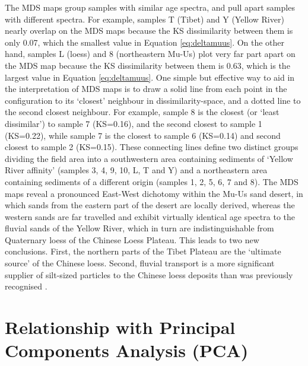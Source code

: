 \documentclass[authoryear,preprint,review,12pt]{elsarticle}
\begin{document}
The MDS maps group samples with similar age spectra, and pull apart
samples with different spectra. For example, samples T (Tibet) and Y
(Yellow River) nearly overlap on the MDS maps because the KS
dissimilarity between them is only 0.07, which the smallest value in
Equation \ref{eq:deltamuus}.  On the other hand, samples L (loess) and
8 (northeastern Mu-Us) plot very far part apart on the MDS map because
the KS dissimilarity between them is 0.63, which is the largest value
in Equation \ref{eq:deltamuus}. One simple but effective way to aid in
the interpretation of MDS maps is to draw a solid line from each point
in the configuration to its `closest' neighbour in
dissimilarity-space, and a dotted line to the second closest
neighbour. For example, sample 8 is the closest (or `least
dissimilar') to sample 7 (KS=0.16), and the second closest to sample 1
(KS=0.22), while sample 7 is the closest to sample 6 (KS=0.14) and
second closest to sample 2 (KS=0.15). These connecting lines define
two distinct groups dividing the field area into a southwestern area
containing sediments of `Yellow River affinity' (samples 3, 4, 9, 10,
L, T and Y) and a northeastern area containing sediments of a
different origin (samples 1, 2, 5, 6, 7 and 8).  The MDS maps reveal a
pronounced East-West dichotomy within the Mu-Us sand desert, in which
sands from the eastern part of the desert are locally derived, whereas
the western sands are far travelled and exhibit virtually identical
age spectra to the fluvial sands of the Yellow River, which in turn
are indistinguishable from Quaternary loess of the Chinese Loess
Plateau. This leads to two new conclusions.  First, the northern parts
of the Tibet Plateau are the `ultimate source' of the Chinese
loess. Second, fluvial transport is a more significant supplier of
silt-sized particles to the Chinese loess deposits than was previously
recognised \citep{stevens2012}.

\section{Relationship with Principal Components Analysis (PCA)}
\label{sec:PCA}
\end{document}
